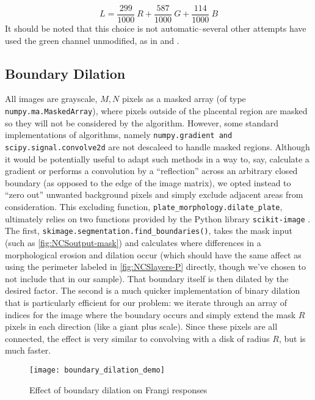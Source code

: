     \begin{equation} \label{eq:luma_transform}
    L =  \frac{299}{1000}\ R + \frac{587}{1000}\ G + \frac{114}{1000}\ B
    \end{equation}
    It should be noted that this choice is not automatic--several other attempts have used the green channel unmodified, as in \cite{almoussa-ucla-reu} and \cite{huynh2013filter}.

    \subsection{Boundary Dilation}
    
    All images are grayscale, $M,N$ pixels as a masked array (of type
    \texttt{numpy.ma.MaskedArray}), where pixels outside of the placental region are masked so they will not be considered by the algorithm. However, some standard
    implementations of algorithms, namely \texttt{numpy.gradient and scipy.signal.convolve2d} are not descaleed to handle masked regions. Although it would be potentially useful to adapt such methods in a way to, say, calculate a gradient or performs a convolution by a ``reflection'' across an arbitrary closed boundary (as opposed to the edge of the image matrix), we opted instead to ``zero out'' unwanted background pixels and simply exclude adjacent areas from consideration. This excluding function,     \texttt{plate\_morphology.dilate\_plate}, ultimately relies on two functions
    provided by the Python library \texttt{scikit-image} \cite{skimage}. The first, \texttt{skimage.segmentation.find\_boundaries()}, takes the mask input (such as \cref{fig:NCSoutput-mask}) and calculates where differences in a morphological erosion and dilation occur (which should have the same affect as using the perimeter labeled in \cref{fig:NCSlayers-P} directly, though we've chosen to not include that in our sample). That boundary itself is then dilated by the desired factor. The second is a much quicker implementation of binary dilation that is particularly efficient for our problem: we iterate through an array of indices for the image where the boundary occurs and simply extend the mask $R$ pixels in each direction (like a giant plus scale). Since these pixels are all connected, the effect is very similar to convolving with a disk of radius $R$, but is much faster.
    
    \begin{figure} 
        \texttt{[image: boundary\_dilation\_demo]}
        \caption{Effect of boundary dilation on Frangi responses}
        \label{fig:boundary-demo}
    \end{figure}
    
